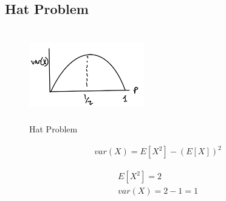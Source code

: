 \subsection{Hat Problem}


\begin{figure}[h]
\centering
\includegraphics[width=5cm, height=4cm]{images/L07/bin_hat_problem.jpeg}
\caption{Hat Problem}
\end{figure}


\begin{align}
var(X) = E[X^2] - (E[X])^2
\label{eq:var_moments}
\end{align}

\begin{align*}
E[X^2]=2\\
var(X)=2-1=1
\end{align*}